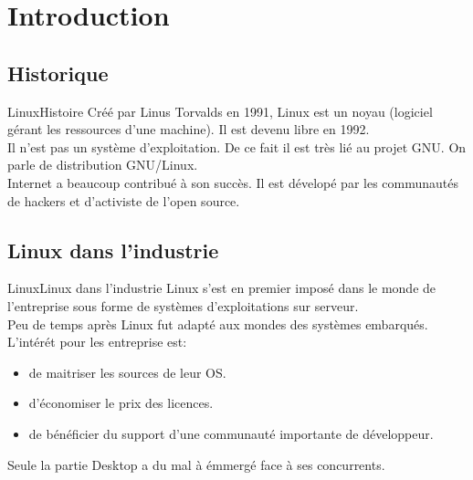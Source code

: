 \section{Introduction}

\subsection{Historique}
\begin{frame}{Linux}{Histoire}
	Créé par Linus Torvalds en 1991, Linux est un noyau (logiciel gérant les ressources d'une machine). Il est devenu libre en 1992.\\
	Il n'est pas un système d'exploitation. De ce fait il est très lié au projet GNU. On parle de distribution GNU/Linux.\\
	Internet a beaucoup contribué à son succès. Il est dévelopé par les communautés de hackers et d'activiste de l'open source.\\
\end{frame}

\subsection{Linux dans l'industrie}
\begin{frame}{Linux}{Linux dans l'industrie}
	Linux s'est en premier imposé dans le monde de l'entreprise sous forme de systèmes d'exploitations sur serveur.\\
	Peu de temps après Linux fut adapté aux mondes des systèmes embarqués.\\
	L'intérét pour les entreprise est:
	\begin{itemize}
		\item
			de maitriser les sources de leur OS.\\
		\item
			d'économiser le prix des licences.\\
		\item
			de bénéficier du support d'une communauté importante de développeur.\\
	\end{itemize}
	Seule la partie Desktop a du mal à émmergé face à ses concurrents.\\
\end{frame}